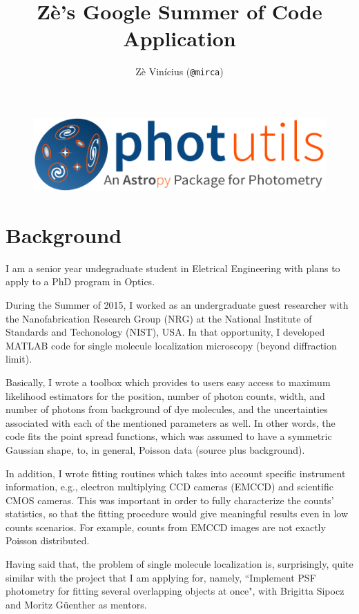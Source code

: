 \documentclass[11pt]{article}
\author{Z\`e Vin\'icius (\texttt{@mirca})}
\title{Z\`e's Google Summer of Code Application}
\begin{document}
\maketitle
\begin{figure}[!htb]
    \centering
    \includegraphics[scale=0.5]{photutils.png}
\end{figure}
\section{Background}

I am a senior year undegraduate student in Eletrical Engineering with plans to apply to a PhD program in Optics. 

During the Summer of 2015, I worked as an undergraduate guest researcher with the Nanofabrication Research Group (NRG) at the National Institute of Standards and Techonology (NIST), USA. In that opportunity, I developed MATLAB code for single molecule localization microscopy (beyond diffraction limit). 

Basically, I wrote a toolbox which provides to users easy access to maximum likelihood estimators for the position, number of photon counts, width, and number of photons from background of dye molecules, and the uncertainties associated with each of the mentioned parameters as well. In other words, the code fits the point spread functions, which was assumed to have a symmetric Gaussian shape, to, in general, Poisson data (source plus background). 

In addition, I wrote fitting routines which takes into account specific instrument information, e.g., electron multiplying CCD cameras (EMCCD) and scientific CMOS cameras. This was important in order to fully characterize the counts' statistics, so that the fitting procedure would give meaningful results even in low counts scenarios. For example, counts from EMCCD images are not exactly Poisson distributed. 

Having said that, the problem of single molecule localization is, surprisingly, quite similar with the project that I am applying for, namely, ``Implement PSF photometry for fitting several overlapping objects at once", with Brigitta Sipocz and Moritz G\"{u}enther as mentors.
\end{document}
